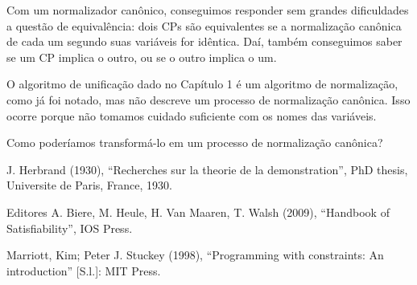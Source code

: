 \documentclass{article}
\theoremstyle{remark}
\theoremstyle{theorem}
\begin{document}
  Com um normalizador canônico, conseguimos responder sem grandes dificuldades a questão de equivalência: dois CPs são equivalentes se a normalização canônica de cada um segundo suas variáveis for idêntica. Daí, também conseguimos saber se um CP implica o outro, ou se o outro implica o um.

  O algoritmo de unificação dado no Capítulo 1 %
é um algoritmo de normalização, como já foi notado, mas não descreve um processo de normalização canônica. Isso ocorre porque não tomamos cuidado suficiente com os nomes das variáveis.

Como poderíamos transformá-lo em um processo de normalização canônica?





  \begin{thebibliography}{1}

      J. Herbrand (1930), ``Recherches sur la theorie de la demonstration'', PhD thesis, Universite de Paris, France, 1930.

      Editores A. Biere, M. Heule, H. Van Maaren, T. Walsh (2009), ``Handbook of Satisfiability'', IOS Press.

      Marriott, Kim; Peter J. Stuckey (1998), ``Programming with constraints: An introduction'' [S.l.]: MIT Press.

  \end{thebibliography}
\end{document}
